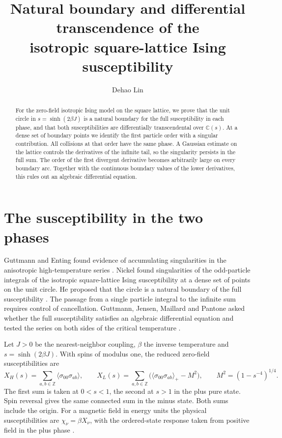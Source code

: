 \documentclass[11pt]{article}
\title{Natural boundary and differential transcendence of the\\
isotropic square-lattice Ising susceptibility}
\author{Dehao Lin}\date{}
\newcommand{\C}{\mathbb C}
\newcommand{\Z}{\mathbb Z}
\begin{document}
\maketitle
\begin{abstract}
For the zero-field isotropic Ising model on the square lattice, we prove
that the unit circle in $s=\sinh(2\beta J)$ is a natural boundary for the
full susceptibility in each phase, and that both susceptibilities are
differentially transcendental over $\C(s)$. At a dense set of boundary
points we identify the first particle order with a singular contribution.
All collisions at that order have the same phase. A Gaussian estimate
on the lattice controls the derivatives of the infinite tail, so the
singularity persists in the full sum. The order of the first divergent
derivative becomes arbitrarily large on every boundary arc. Together
with the continuous boundary values of the lower derivatives, this
rules out an algebraic differential equation.
\end{abstract}

\section{The susceptibility in the two phases}

Guttmann and Enting found evidence of accumulating singularities in the
anisotropic high-temperature series \cite{GE}.
Nickel found singularities of the odd-particle integrals of the
isotropic square-lattice Ising susceptibility at a dense set of points
on the unit circle. He proposed that the circle is a natural boundary
of the full susceptibility \cite{Nickel}. The passage from a single
particle integral to the infinite sum requires control of cancellation.
Guttmann, Jensen, Maillard and Pantone asked whether the full
susceptibility satisfies an algebraic differential equation and tested
the series on both sides of the critical temperature \cite[Sec.~6]{GJMP}.

Let $J>0$ be the nearest-neighbor coupling, $\beta$ the inverse
temperature and $s=\sinh(2\beta J)$. With spins of modulus one, the
reduced zero-field susceptibilities are
\[
 X_H(s)=\sum_{a,b\in\Z}\langle\sigma_{00}\sigma_{ab}\rangle,\qquad
 X_L(s)=\sum_{a,b\in\Z}
 \bigl(\langle\sigma_{00}\sigma_{ab}\rangle_+-M^2\bigr),
 \qquad M^2=(1-s^{-4})^{1/4}.
\]
The first sum is taken at $0<s<1$, the second at $s>1$ in the plus
pure state. Spin reversal gives the same connected sum in the minus
state. Both sums include the origin. For a magnetic field in energy
units the physical susceptibilities are $\chi_\nu=\beta X_\nu$,
with the ordered-state response taken from positive field in the
plus phase \cite[(1.7)--(1.10)]{ONGP}.
\end{document}
